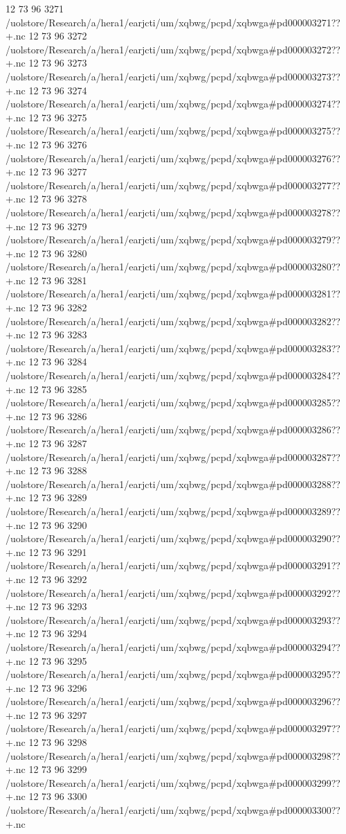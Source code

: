 12 73 96
3271
/uolstore/Research/a/hera1/earjcti/um/xqbwg/pcpd/xqbwga#pd000003271??+.nc
12 73 96
3272
/uolstore/Research/a/hera1/earjcti/um/xqbwg/pcpd/xqbwga#pd000003272??+.nc
12 73 96
3273
/uolstore/Research/a/hera1/earjcti/um/xqbwg/pcpd/xqbwga#pd000003273??+.nc
12 73 96
3274
/uolstore/Research/a/hera1/earjcti/um/xqbwg/pcpd/xqbwga#pd000003274??+.nc
12 73 96
3275
/uolstore/Research/a/hera1/earjcti/um/xqbwg/pcpd/xqbwga#pd000003275??+.nc
12 73 96
3276
/uolstore/Research/a/hera1/earjcti/um/xqbwg/pcpd/xqbwga#pd000003276??+.nc
12 73 96
3277
/uolstore/Research/a/hera1/earjcti/um/xqbwg/pcpd/xqbwga#pd000003277??+.nc
12 73 96
3278
/uolstore/Research/a/hera1/earjcti/um/xqbwg/pcpd/xqbwga#pd000003278??+.nc
12 73 96
3279
/uolstore/Research/a/hera1/earjcti/um/xqbwg/pcpd/xqbwga#pd000003279??+.nc
12 73 96
3280
/uolstore/Research/a/hera1/earjcti/um/xqbwg/pcpd/xqbwga#pd000003280??+.nc
12 73 96
3281
/uolstore/Research/a/hera1/earjcti/um/xqbwg/pcpd/xqbwga#pd000003281??+.nc
12 73 96
3282
/uolstore/Research/a/hera1/earjcti/um/xqbwg/pcpd/xqbwga#pd000003282??+.nc
12 73 96
3283
/uolstore/Research/a/hera1/earjcti/um/xqbwg/pcpd/xqbwga#pd000003283??+.nc
12 73 96
3284
/uolstore/Research/a/hera1/earjcti/um/xqbwg/pcpd/xqbwga#pd000003284??+.nc
12 73 96
3285
/uolstore/Research/a/hera1/earjcti/um/xqbwg/pcpd/xqbwga#pd000003285??+.nc
12 73 96
3286
/uolstore/Research/a/hera1/earjcti/um/xqbwg/pcpd/xqbwga#pd000003286??+.nc
12 73 96
3287
/uolstore/Research/a/hera1/earjcti/um/xqbwg/pcpd/xqbwga#pd000003287??+.nc
12 73 96
3288
/uolstore/Research/a/hera1/earjcti/um/xqbwg/pcpd/xqbwga#pd000003288??+.nc
12 73 96
3289
/uolstore/Research/a/hera1/earjcti/um/xqbwg/pcpd/xqbwga#pd000003289??+.nc
12 73 96
3290
/uolstore/Research/a/hera1/earjcti/um/xqbwg/pcpd/xqbwga#pd000003290??+.nc
12 73 96
3291
/uolstore/Research/a/hera1/earjcti/um/xqbwg/pcpd/xqbwga#pd000003291??+.nc
12 73 96
3292
/uolstore/Research/a/hera1/earjcti/um/xqbwg/pcpd/xqbwga#pd000003292??+.nc
12 73 96
3293
/uolstore/Research/a/hera1/earjcti/um/xqbwg/pcpd/xqbwga#pd000003293??+.nc
12 73 96
3294
/uolstore/Research/a/hera1/earjcti/um/xqbwg/pcpd/xqbwga#pd000003294??+.nc
12 73 96
3295
/uolstore/Research/a/hera1/earjcti/um/xqbwg/pcpd/xqbwga#pd000003295??+.nc
12 73 96
3296
/uolstore/Research/a/hera1/earjcti/um/xqbwg/pcpd/xqbwga#pd000003296??+.nc
12 73 96
3297
/uolstore/Research/a/hera1/earjcti/um/xqbwg/pcpd/xqbwga#pd000003297??+.nc
12 73 96
3298
/uolstore/Research/a/hera1/earjcti/um/xqbwg/pcpd/xqbwga#pd000003298??+.nc
12 73 96
3299
/uolstore/Research/a/hera1/earjcti/um/xqbwg/pcpd/xqbwga#pd000003299??+.nc
12 73 96
3300
/uolstore/Research/a/hera1/earjcti/um/xqbwg/pcpd/xqbwga#pd000003300??+.nc
